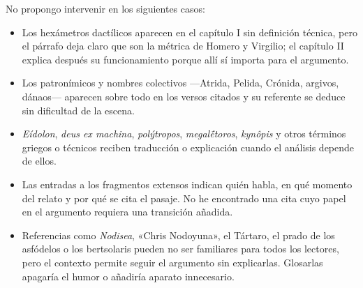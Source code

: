 \documentclass[12pt,a4paper]{article}
\begin{document}
No propongo intervenir en los siguientes casos:

\begin{itemize}[leftmargin=*]
  \item Los hexámetros dactílicos aparecen en el capítulo I sin definición técnica, pero el párrafo deja claro que son la métrica de Homero y Virgilio; el capítulo II explica después su funcionamiento porque allí sí importa para el argumento.
  \item Los patronímicos y nombres colectivos ---Atrida, Pelida, Crónida, argivos, dánaos--- aparecen sobre todo en los versos citados y su referente se deduce sin dificultad de la escena.
  \item \emph{Eídolon}, \emph{deus ex machina}, \emph{polýtropos}, \emph{megalḗtoros}, \emph{kynôpis} y otros términos griegos o técnicos reciben traducción o explicación cuando el análisis depende de ellos.
  \item Las entradas a los fragmentos extensos indican quién habla, en qué momento del relato y por qué se cita el pasaje. No he encontrado una cita cuyo papel en el argumento requiera una transición añadida.
  \item Referencias como \emph{Nodisea}, «Chris Nodoyuna», el Tártaro, el prado de los asfódelos o los bertsolaris pueden no ser familiares para todos los lectores, pero el contexto permite seguir el argumento sin explicarlas. Glosarlas apagaría el humor o añadiría aparato innecesario.
\end{itemize}
\end{document}
